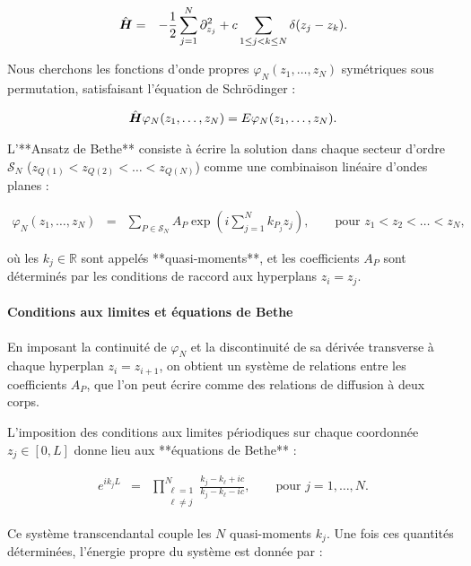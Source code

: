 \begin{eqnarray}
	\hat{\bm{H}} & = & -\frac{1}{2} \sum_{j=1}^N \partial_{z_j}^2 + c \sum_{1 \leq j < k \leq N} \delta(z_j - z_k).
\end{eqnarray}

Nous cherchons les fonctions d’onde propres \(\varphi_N(z_1, \dots, z_N)\) symétriques sous permutation, satisfaisant l’équation de Schrödinger :

\begin{eqnarray}
	\hat{\bm{H}} \varphi_N(z_1, \dots, z_N) = E \varphi_N(z_1, \dots, z_N).
\end{eqnarray}

L’**Ansatz de Bethe** consiste à écrire la solution dans chaque secteur d’ordre \(\mathcal{S}_N\) (\(z_{Q(1)} < z_{Q(2)} < \dots < z_{Q(N)}\)) comme une combinaison linéaire d’ondes planes :

\begin{eqnarray}
	\varphi_N(z_1, \dots, z_N) & = & \sum_{P \in \mathcal{S}_N} A_P \exp\left(i \sum_{j=1}^N k_{P_j} z_j \right), \qquad \text{pour } z_1 < z_2 < \dots < z_N,
\end{eqnarray}

où les \(k_j \in \mathbb{R}\) sont appelés **quasi-moments**, et les coefficients \(A_P\) sont déterminés par les conditions de raccord aux hyperplans \(z_i = z_j\).

\paragraph{Conditions aux limites et équations de Bethe}

En imposant la continuité de \(\varphi_N\) et la discontinuité de sa dérivée transverse à chaque hyperplan \(z_i = z_{i+1}\), on obtient un système de relations entre les coefficients \(A_P\), que l’on peut écrire comme des relations de diffusion à deux corps.

L’imposition des conditions aux limites périodiques sur chaque coordonnée \(z_j \in [0, L]\) donne lieu aux **équations de Bethe** :

\begin{eqnarray}
	e^{i k_j L} & = & \prod_{\substack{\ell = 1 \\ \ell \neq j}}^N \frac{k_j - k_\ell + i c}{k_j - k_\ell - i c}, \qquad \text{pour } j = 1, \dots, N. \label{eq:bethe}
\end{eqnarray}

Ce système transcendantal couple les \(N\) quasi-moments \(k_j\). Une fois ces quantités déterminées, l’énergie propre du système est donnée par :

